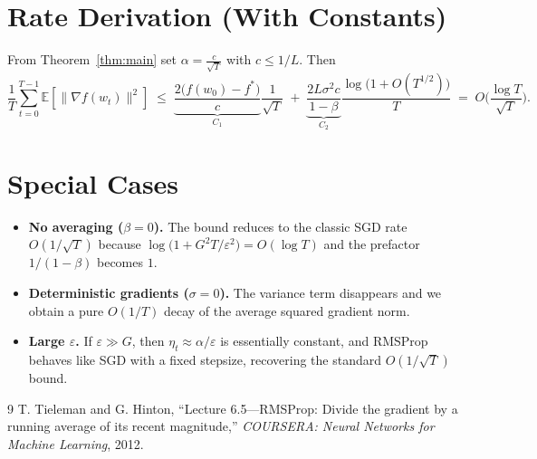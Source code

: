 \documentclass[11pt]{article}
\newcommand{\E}{\mathbb{E}}
\begin{document}
\section*{Rate Derivation (With Constants)}
From Theorem~\ref{thm:main} set $\alpha = \frac{c}{\sqrt{T}}$ with $c\le 1/L$.  Then
\[
\frac{1}{T}\sum_{t=0}^{T-1}\E[\|\nabla f(w_t)\|^{2}]
\;\le\;
\underbrace{\frac{2\big(f(w_0)-f^{*}\big)}{c}}_{\displaystyle C_{1}}\frac{1}{\sqrt{T}}
\;+\;
\underbrace{\frac{2L\sigma^{2}c}{1-\beta}}_{\displaystyle C_{2}}
\frac{\log\!\big(1+O(T^{1/2})\big)}{T}
\;=\;
O\!\bigg(\frac{\log T}{\sqrt{T}}\bigg).
\]

\section*{Special Cases}
\begin{itemize}
\item \textbf{No averaging ($\beta=0$).}  The bound reduces to the classic SGD rate $O(1/\sqrt{T})$ because $\log\!\big(1+G^{2}T/\varepsilon^{2}\big)=O(\log T)$ and the prefactor $1/(1-\beta)$ becomes $1$.
\item \textbf{Deterministic gradients ($\sigma=0$).}  The variance term disappears and we obtain a pure $O(1/T)$ decay of the average squared gradient norm.
\item \textbf{Large $\varepsilon$.}  If $\varepsilon\gg G$, then $\eta_t\approx\alpha/\varepsilon$ is essentially constant, and RMSProp behaves like SGD with a fixed stepsize, recovering the standard $O(1/\sqrt{T})$ bound.
\end{itemize}

\begin{thebibliography}{9}
T. Tieleman and G. Hinton, ``Lecture 6.5—RMSProp: Divide the gradient by a running average of its recent magnitude,'' \emph{COURSERA: Neural Networks for Machine Learning}, 2012.
\end{thebibliography}
\end{document}
